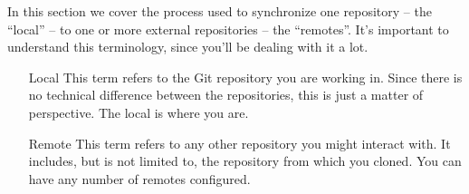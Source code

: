In this section we cover the process used to synchronize one
repository -- the ``local'' -- to one or more external repositories --
the ``remotes''. It's important to understand this terminology, since
you'll be dealing with it a lot.

\begin{enumerate}
\item[Local]{This term refers to the Git repository you are
  working in. Since there is no technical difference between the
  repositories, this is just a matter of perspective. The local is
  where you are.}
\item[Remote]{This term refers to any other repository you might
  interact with. It includes, but is not limited to,
  the repository from which you cloned. You can have any number of
  remotes configured.}
\end{enumerate}

